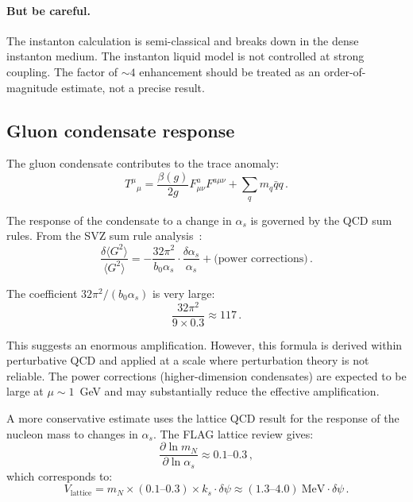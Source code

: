 \documentclass[aps,prd,twocolumn,superscriptaddress,floatfix,nofootinbib]{revtex4-2}
\newcommand{\as}{\alpha_s}
\newcommand{\mN}{m_N}
\newcommand{\ks}{k_s}
\newcommand{\dpsi}{\delta\psi}
\begin{document}
\paragraph{But be careful.}
The instanton calculation is semi-classical and breaks down in the dense
instanton medium. The instanton liquid model is not controlled at strong
coupling. The factor of $\sim 4$ enhancement should be treated as an
order-of-magnitude estimate, not a precise result.

\subsection{Gluon condensate response}\label{sec:gluon_cond}

The gluon condensate contributes to the trace anomaly:
\begin{equation}
T^\mu{}_\mu = \frac{\beta(g)}{2g} F^a_{\mu\nu} F^{a\mu\nu}
+ \sum_q m_q \bar{q} q \, .
\label{eq:trace_anomaly}
\end{equation}

The response of the condensate to a change in $\as$ is governed by the
QCD sum rules. From the SVZ sum rule analysis~\cite{SVZ1979}:
\begin{equation}
\frac{\delta \langle G^2 \rangle}{\langle G^2 \rangle}
= -\frac{32\pi^2}{b_0 \as} \cdot \frac{\delta\as}{\as}
+ \text{(power corrections)} \, .
\label{eq:condensate_response}
\end{equation}

The coefficient $32\pi^2/(b_0 \as)$ is very large:
\begin{equation}
\frac{32\pi^2}{9 \times 0.3} \approx 117 \, .
\end{equation}

This suggests an enormous amplification. However, this formula is derived
within perturbative QCD and applied at a scale where perturbation theory
is not reliable. The power corrections (higher-dimension condensates) are
expected to be large at $\mu \sim 1$~GeV and may substantially reduce the
effective amplification.

A more conservative estimate uses the lattice QCD result for the response
of the nucleon mass to changes in $\as$. The FLAG lattice review gives:
\begin{equation}
\frac{\partial \ln \mN}{\partial \ln \as} \approx 0.1 \text{--} 0.3 \, ,
\label{eq:lattice_response}
\end{equation}
which corresponds to:
\begin{equation}
V_{\mathrm{lattice}} = \mN \times (0.1\text{--}0.3) \times \ks \cdot \dpsi
\approx (1.3\text{--}4.0)~\text{MeV} \cdot \dpsi \, .
\label{eq:V_lattice}
\end{equation}
\end{document}
